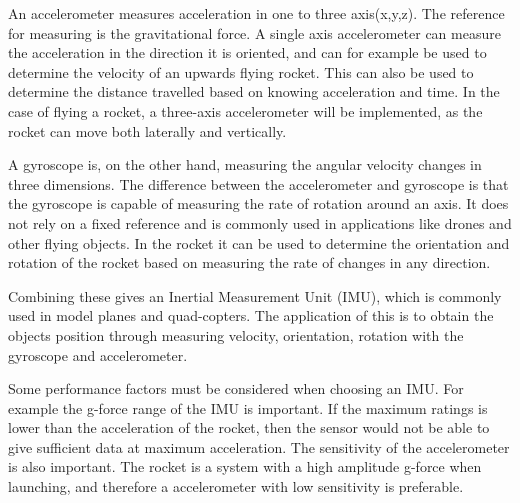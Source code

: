 %

An accelerometer measures acceleration in one to three axis(x,y,z). The reference for measuring is the gravitational force. A single axis accelerometer can measure the acceleration in the direction it is oriented, and can for example be used to determine the velocity of an upwards flying rocket. This can also be used to determine the distance travelled based on knowing acceleration and time. In the case of flying a rocket, a three-axis accelerometer will be implemented, as the rocket can move both laterally and vertically.  


A gyroscope is, on the other hand, measuring the angular velocity changes in three dimensions. The difference between the accelerometer and gyroscope is that the gyroscope is capable of measuring the rate of rotation around an axis. It does not rely on a fixed reference and is commonly used in applications like drones and other flying objects. In the rocket it can be used to determine the orientation and rotation of the rocket based on measuring the rate of changes in any direction.  


Combining these gives an Inertial Measurement Unit (IMU), which is commonly used in model planes and quad-copters. The application of this is to obtain the objects position through measuring velocity, orientation, rotation with the gyroscope and accelerometer. 
    	  
Some performance factors must be considered when choosing an IMU. For example the g-force range of the IMU is important. If the maximum ratings is lower than the acceleration of the rocket, then the sensor would not be able to give sufficient data at maximum acceleration. The sensitivity of the accelerometer is also important. The rocket is a system with a high amplitude g-force when launching, and therefore a accelerometer with low sensitivity is preferable.

